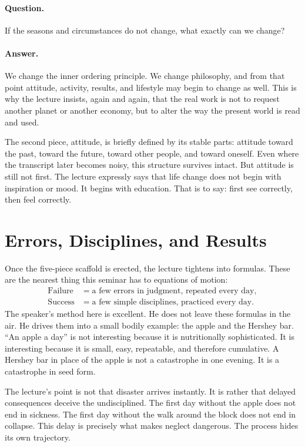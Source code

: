 \paragraph{Question.} If the seasons and circumstances do not change, what exactly can we change?

\paragraph{Answer.} We change the inner ordering principle. We change philosophy, and from that point attitude, activity, results, and lifestyle may begin to change as well. This is why the lecture insists, again and again, that the real work is not to request another planet or another economy, but to alter the way the present world is read and used.

The second piece, attitude, is briefly defined by its stable parts: attitude toward the past, toward the future, toward other people, and toward oneself. Even where the transcript later becomes noisy, this structure survives intact. But attitude is still not first. The lecture expressly says that life change does not begin with inspiration or mood. It begins with education. That is to say: first see correctly, then feel correctly.

\section{Errors, Disciplines, and Results}

Once the five-piece scaffold is erected, the lecture tightens into formulas. These are the nearest thing this seminar has to equations of motion:
\begin{align}
\mathrm{Failure} &= \text{a few errors in judgment, repeated every day},\\
\mathrm{Success} &= \text{a few simple disciplines, practiced every day}.
\end{align}
The speaker's method here is excellent. He does not leave these formulas in the air. He drives them into a small bodily example: the apple and the Hershey bar. ``An apple a day'' is not interesting because it is nutritionally sophisticated. It is interesting because it is small, easy, repeatable, and therefore cumulative. A Hershey bar in place of the apple is not a catastrophe in one evening. It is a catastrophe in seed form.

The lecture's point is not that disaster arrives instantly. It is rather that delayed consequences deceive the undisciplined. The first day without the apple does not end in sickness. The first day without the walk around the block does not end in collapse. This delay is precisely what makes neglect dangerous. The process hides its own trajectory.

